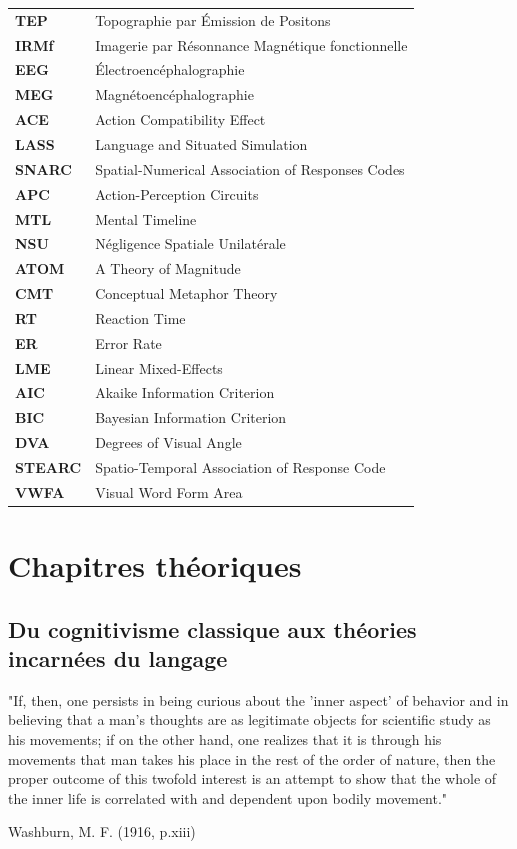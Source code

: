 \documentclass[
  a4paper,12pt,twoside,onecolumn,openright,final,oldfontcommands]{memoir}
\newcommand\chaptercolor{gray}
\newcommand{\changechaptercolor}[1]{
  \renewcommand\chaptercolor{#1}
}
\newcommand\blankpage{%
    \null
    \thispagestyle{empty}%
    \newpage
    }
\newcommand\nomenclature[2]{#1 & #2 \\}
\begin{document}
\begin{longtable}{@{}p{2cm}@{}p{\dimexpr\textwidth-2cm\relax}@{}}

\nomenclature{\textbf{TEP}}{Topographie par Émission de Positons}
\nomenclature{\textbf{IRMf}}{Imagerie par Résonnance Magnétique fonctionnelle}
\nomenclature{\textbf{EEG}}{Électroencéphalographie}
\nomenclature{\textbf{MEG}}{Magnétoencéphalographie}
\nomenclature{\textbf{ACE}}{Action Compatibility Effect}
\nomenclature{\textbf{LASS}}{Language and Situated Simulation}
\nomenclature{\textbf{SNARC}}{Spatial-Numerical Association of Responses Codes}
\nomenclature{\textbf{APC}}{Action-Perception Circuits}
\nomenclature{\textbf{MTL}}{Mental Timeline}
\nomenclature{\textbf{NSU}}{Négligence Spatiale Unilatérale}
\nomenclature{\textbf{ATOM}}{A Theory of Magnitude}
\nomenclature{\textbf{CMT}}{Conceptual Metaphor Theory}
\nomenclature{\textbf{RT}}{Reaction Time}
\nomenclature{\textbf{ER}}{Error Rate}
\nomenclature{\textbf{LME}}{Linear Mixed-Effects}
\nomenclature{\textbf{AIC}}{Akaike Information Criterion}
\nomenclature{\textbf{BIC}}{Bayesian Information Criterion}
\nomenclature{\textbf{DVA}}{Degrees of Visual Angle}
\nomenclature{\textbf{STEARC}}{Spatio-Temporal Association of Response Code}
\nomenclature{\textbf{VWFA}}{Visual Word Form Area}
\end{longtable}

\newpage
\blankpage


\hypertarget{part-chapitres-thuxe9oriques}{%
\part{Chapitres théoriques}\label{part-chapitres-thuxe9oriques}}

\sloppy
\changechaptercolor{hokusai1}

\hypertarget{chap1}{%
\chapter{Du cognitivisme classique aux théories incarnées du langage}\label{chap1}}

\epigraph{"If, then, one persists in being curious about the 'inner aspect' of behavior and in believing that a man's thoughts are as legitimate objects for scientific study as his movements; if on the other hand, one realizes that it is through his movements that man takes his place in the rest of the order of nature, then the proper outcome of this twofold interest is an attempt to show that the whole of the inner life is correlated with and dependent upon bodily movement."}{Washburn, M. F. (1916, p.xiii)}
\end{document}
